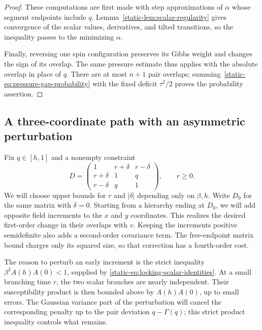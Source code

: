 \begin{proof}
These computations are first made with step approximations of $\alpha$
whose segment endpoints include $q$. Lemma~\ref{static-lem:scalar-regularity}
gives convergence of the scalar values, derivatives, and tilted
transitions, so the inequality passes to the minimizing $\alpha$.

Finally, reversing one spin configuration preserves its Gibbs weight
and changes the sign of its overlap. The same pressure estimate thus
applies with the absolute overlap in place of $q$. There are at most
$n+1$ pair overlaps; summing~\eqref{static-eq:pressure-gap-probability}
with the fixed deficit $\tau^2/2$ proves the probability assertion.
\end{proof}

\subsection{A three-coordinate path with an asymmetric perturbation}
\label{static-subsec:locking-base}

Fix $q\in[h,1]$ and a nonempty constraint
\begin{equation}
\label{static-eq:locking-gram}
 D=\begin{pmatrix}
 1&r+\delta&r-\delta\\
 r+\delta&1&q\\
 r-\delta&q&1
 \end{pmatrix},\qquad r\geq0.
\end{equation}
We will choose upper bounds for $r$ and $|\delta|$ depending only on
$\beta,h$. Write $D_0$ for the same matrix with $\delta=0$. Starting
from a hierarchy ending at $D_0$, we will add opposite field increments
to the $x$ and $y$ coordinates. This realizes the desired first-order
change in their overlaps with $v$. Keeping the increments positive
semidefinite also adds a second-order covariance term. The free-endpoint
matrix bound charges only its squared size, so that correction has a
fourth-order cost.

The reason to perturb an early increment is the strict inequality
$\beta^2A(h)A(0)<1$, supplied by
\eqref{static-eq:locking-scalar-identities}. At a small branching time
$r$, the two scalar branches are nearly independent. Their
susceptibility product is then bounded above by $A(h)A(0)$, up to
small errors.
The Gaussian variance part of the perturbation will cancel the
corresponding penalty up to the pair deviation $q-\Gamma(q)$; this
strict product inequality controls what remains.

